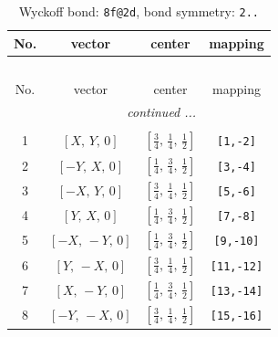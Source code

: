 \documentclass[fleqn,8pt]{jsarticle}
\begin{document}
\begin{longtable}{cccc}
\caption{Wyckoff bond: {\tt 8f@2d}, bond symmetry: {\tt 2..}}
 \\
 \hline \hline
No. & vector & center & mapping \\ \hline \endfirsthead

\multicolumn{3}{l}{\tablename\ \thetable{}} \\
 \hline \hline
No. & vector & center & mapping \\ \hline \endhead

 \hline \hline
\multicolumn{3}{r}{\footnotesize\it continued ...} \\ \endfoot

 \hline \hline
\multicolumn{3}{r}{} \\ \endlastfoot

1 & $\left[ X,\, Y,\, 0 \right]$ & $\left[ \frac{3}{4},\, \frac{1}{4},\, \frac{1}{2} \right]$ & {\tt [1,-2]} \\ \hline
2 & $\left[ - Y,\, X,\, 0 \right]$ & $\left[ \frac{1}{4},\, \frac{3}{4},\, \frac{1}{2} \right]$ & {\tt [3,-4]} \\ \hline
3 & $\left[ - X,\, Y,\, 0 \right]$ & $\left[ \frac{3}{4},\, \frac{1}{4},\, \frac{1}{2} \right]$ & {\tt [5,-6]} \\ \hline
4 & $\left[ Y,\, X,\, 0 \right]$ & $\left[ \frac{1}{4},\, \frac{3}{4},\, \frac{1}{2} \right]$ & {\tt [7,-8]} \\ \hline
5 & $\left[ - X,\, - Y,\, 0 \right]$ & $\left[ \frac{1}{4},\, \frac{3}{4},\, \frac{1}{2} \right]$ & {\tt [9,-10]} \\ \hline
6 & $\left[ Y,\, - X,\, 0 \right]$ & $\left[ \frac{3}{4},\, \frac{1}{4},\, \frac{1}{2} \right]$ & {\tt [11,-12]} \\ \hline
7 & $\left[ X,\, - Y,\, 0 \right]$ & $\left[ \frac{1}{4},\, \frac{3}{4},\, \frac{1}{2} \right]$ & {\tt [13,-14]} \\ \hline
8 & $\left[ - Y,\, - X,\, 0 \right]$ & $\left[ \frac{3}{4},\, \frac{1}{4},\, \frac{1}{2} \right]$ & {\tt [15,-16]} \\
\end{longtable}
\renewcommand{\arraystretch}{1.2}
\end{document}
